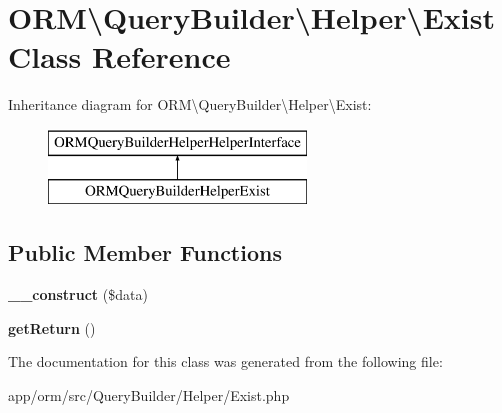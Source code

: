 \hypertarget{classORM_1_1QueryBuilder_1_1Helper_1_1Exist}{}\section{O\+RM\textbackslash{}Query\+Builder\textbackslash{}Helper\textbackslash{}Exist Class Reference}
\label{classORM_1_1QueryBuilder_1_1Helper_1_1Exist}
Inheritance diagram for O\+RM\textbackslash{}Query\+Builder\textbackslash{}Helper\textbackslash{}Exist\+:\begin{figure}[H]
\begin{center}
\leavevmode
\includegraphics[height=2.000000cm]{classORM_1_1QueryBuilder_1_1Helper_1_1Exist}
\end{center}
\end{figure}
\subsection*{Public Member Functions}
\begin{DoxyCompactItemize}
\item 
{\bfseries \+\_\+\+\_\+construct} (\$data)\hypertarget{classORM_1_1QueryBuilder_1_1Helper_1_1Exist_a839c6c9390d763c00e7187e90347da44}{}\label{classORM_1_1QueryBuilder_1_1Helper_1_1Exist_a839c6c9390d763c00e7187e90347da44}

\item 
{\bfseries get\+Return} ()\hypertarget{classORM_1_1QueryBuilder_1_1Helper_1_1Exist_a4772ad152d497ee7e8c1cf5677ec607d}{}\label{classORM_1_1QueryBuilder_1_1Helper_1_1Exist_a4772ad152d497ee7e8c1cf5677ec607d}

\end{DoxyCompactItemize}


The documentation for this class was generated from the following file\+:\begin{DoxyCompactItemize}
\item 
app/orm/src/\+Query\+Builder/\+Helper/Exist.\+php\end{DoxyCompactItemize}
